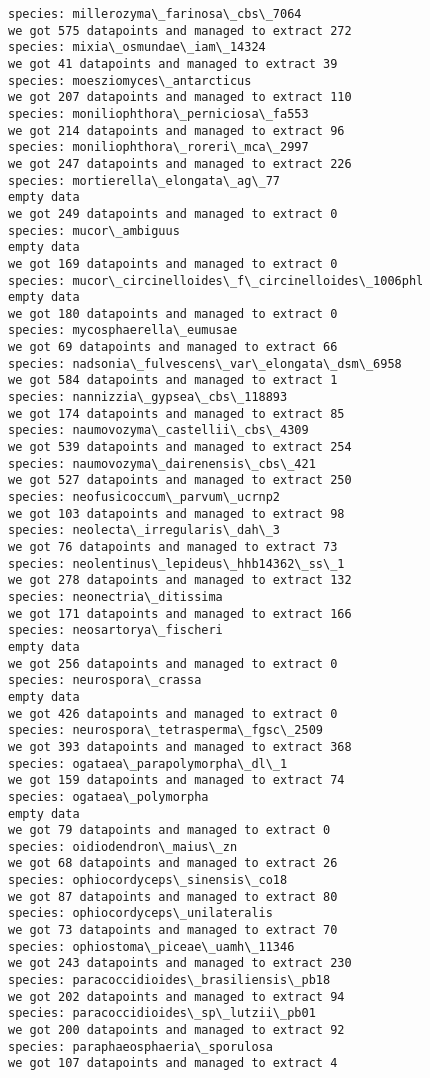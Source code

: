 \documentclass[11pt]{article}
\begin{document}
\begin{Verbatim}[commandchars=\\\{\}]
species: millerozyma\_farinosa\_cbs\_7064
we got 575 datapoints and managed to extract 272
species: mixia\_osmundae\_iam\_14324
we got 41 datapoints and managed to extract 39
species: moesziomyces\_antarcticus
we got 207 datapoints and managed to extract 110
species: moniliophthora\_perniciosa\_fa553
we got 214 datapoints and managed to extract 96
species: moniliophthora\_roreri\_mca\_2997
we got 247 datapoints and managed to extract 226
species: mortierella\_elongata\_ag\_77
empty data
we got 249 datapoints and managed to extract 0
species: mucor\_ambiguus
empty data
we got 169 datapoints and managed to extract 0
species: mucor\_circinelloides\_f\_circinelloides\_1006phl
empty data
we got 180 datapoints and managed to extract 0
species: mycosphaerella\_eumusae
we got 69 datapoints and managed to extract 66
species: nadsonia\_fulvescens\_var\_elongata\_dsm\_6958
we got 584 datapoints and managed to extract 1
species: nannizzia\_gypsea\_cbs\_118893
we got 174 datapoints and managed to extract 85
species: naumovozyma\_castellii\_cbs\_4309
we got 539 datapoints and managed to extract 254
species: naumovozyma\_dairenensis\_cbs\_421
we got 527 datapoints and managed to extract 250
species: neofusicoccum\_parvum\_ucrnp2
we got 103 datapoints and managed to extract 98
species: neolecta\_irregularis\_dah\_3
we got 76 datapoints and managed to extract 73
species: neolentinus\_lepideus\_hhb14362\_ss\_1
we got 278 datapoints and managed to extract 132
species: neonectria\_ditissima
we got 171 datapoints and managed to extract 166
species: neosartorya\_fischeri
empty data
we got 256 datapoints and managed to extract 0
species: neurospora\_crassa
empty data
we got 426 datapoints and managed to extract 0
species: neurospora\_tetrasperma\_fgsc\_2509
we got 393 datapoints and managed to extract 368
species: ogataea\_parapolymorpha\_dl\_1
we got 159 datapoints and managed to extract 74
species: ogataea\_polymorpha
empty data
we got 79 datapoints and managed to extract 0
species: oidiodendron\_maius\_zn
we got 68 datapoints and managed to extract 26
species: ophiocordyceps\_sinensis\_co18
we got 87 datapoints and managed to extract 80
species: ophiocordyceps\_unilateralis
we got 73 datapoints and managed to extract 70
species: ophiostoma\_piceae\_uamh\_11346
we got 243 datapoints and managed to extract 230
species: paracoccidioides\_brasiliensis\_pb18
we got 202 datapoints and managed to extract 94
species: paracoccidioides\_sp\_lutzii\_pb01
we got 200 datapoints and managed to extract 92
species: paraphaeosphaeria\_sporulosa
we got 107 datapoints and managed to extract 4

\end{Verbatim}
\end{document}
